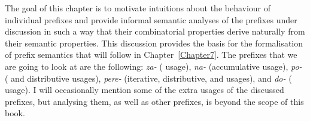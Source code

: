  

The goal of this chapter is to motivate intuitions about the behaviour of individual prefixes and provide informal semantic analyses of the prefixes under discussion in such a way that their combinatorial properties derive naturally from their semantic properties. 
This discussion provides the basis for the formalisation of prefix semantics that will follow in Chapter~\ref{Chapter7}. The prefixes that we are going to look at are the following: \textit{za-} ( usage), \textit{na-} (accumulative usage), \textit{po-} ( and distributive usages), \textit{pere-} (iterative, distributive, and  usages), and \textit{do-} ( usage). I will occasionally mention some of the extra usages of the discussed prefixes, but analysing them, as well as other prefixes, is beyond the scope of this book.

